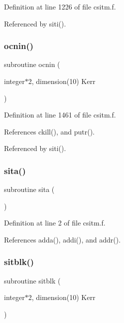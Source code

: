 Definition at line 1226 of file csitm.\+f.



Referenced by siti().

\mbox{\label{csitm_8f_a640a106fb8f7ce53f206e6381b7fd067}} 
\subsubsection{\texorpdfstring{ocnin()}{ocnin()}}
{\footnotesize\ttfamily subroutine ocnin (\begin{DoxyParamCaption}\item[{integer$\ast$2, dimension(10)}]{Kerr }\end{DoxyParamCaption})}



Definition at line 1461 of file csitm.\+f.



References ckill(), and putr().



Referenced by siti().

\mbox{\label{csitm_8f_a9601fba281579c0631d439803ca96317}} 
\subsubsection{\texorpdfstring{sita()}{sita()}}
{\footnotesize\ttfamily subroutine sita (\begin{DoxyParamCaption}{ }\end{DoxyParamCaption})}



Definition at line 2 of file csitm.\+f.



References adda(), addi(), and addr().

\mbox{\label{csitm_8f_ae97b72650e85eae768f87ff9ba943531}} 
\subsubsection{\texorpdfstring{sitblk()}{sitblk()}}
{\footnotesize\ttfamily subroutine sitblk (\begin{DoxyParamCaption}\item[{integer$\ast$2, dimension(10)}]{Kerr }\end{DoxyParamCaption})}



